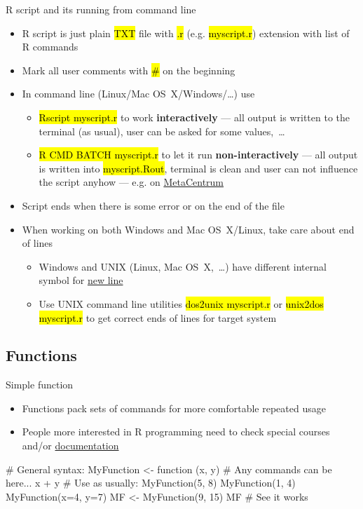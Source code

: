 \documentclass[compress, ucs, xelatex, 11pt, xcolor=svgnames,
  hyperref={
    bookmarks=true,
    unicode=true,
    colorlinks=true,
    pdftitle={Molecular data in R},
    plainpages=false,
    pdfauthor={Vojtech Zeisek},
    pdfsubject={Course about phylogeny and evolution in R},
    pdfcreator={XeLaTeX},
    pdfkeywords={R, evolution, phylogeny, molecular data},
    linkcolor=Tomato,
    anchorcolor=SaddleBrown,
    citecolor=Goldenrod,
    filecolor=DarkMagenta,
    menucolor=Sienna,
    urlcolor=DarkTurquoise,
    pdftex},
  url={hyphens, lowtilde} %
  ]{beamer}
\renewcommand{\texttt}[1]{\hl{\ttfamily #1}}
\begin{document}
\begin{frame}{R script and its running from command line}
  \begin{itemize}
    \item R script is just plain \texttt{TXT} file with \texttt{.r} (e.g. \texttt{myscript.r}) extension with list of R commands
    \item Mark all user comments with \texttt{\#} on the beginning
    \item In command line (Linux/Mac OS~X/Windows/\ldots) use
    \begin{itemize}
      \item \texttt{Rscript myscript.r} to work \textbf{interactively} --- all output is written to the terminal (as usual), user can be asked for some values,~\ldots
      \item \texttt{R CMD BATCH myscript.r} to let it run \textbf{non-interactively} --- all output is written into \texttt{myscript.Rout}, terminal is clean and user can not influence the script anyhow --- e.g. on \href{https://www.metacentrum.cz/en/}{MetaCentrum}
    \end{itemize}
    \item Script ends when there is some error or on the end of the file
    \item When working on both Windows and Mac OS~X/Linux, take care about end of lines
    \begin{itemize}
      \item Windows and UNIX (Linux, Mac OS~X,~\ldots) have different internal symbol for \href{https://en.wikipedia.org/wiki/Newline}{new line}
      \item Use UNIX command line utilities \texttt{dos2unix myscript.r} or \texttt{unix2dos myscript.r} to get correct ends of lines for target system
    \end{itemize}
  \end{itemize}
\end{frame}

\subsection{Functions}

\begin{frame}[fragile]{Simple function}
  \begin{itemize}
    \item Functions pack sets of commands for more comfortable repeated usage
    \item People more interested in R programming need to check special courses and/or \href{https://cran.r-project.org/manuals.html}{documentation}
  \end{itemize}
  \begin{spluscode}
    # General syntax:
    MyFunction <- function (x, y) {
      # Any commands can be here...
      x + y
      }
    # Use as usually:
    MyFunction(5, 8)
    MyFunction(1, 4)
    MyFunction(x=4, y=7)
    MF <- MyFunction(9, 15)
    MF # See it works
  \end{spluscode}
\end{frame}
\end{document}
